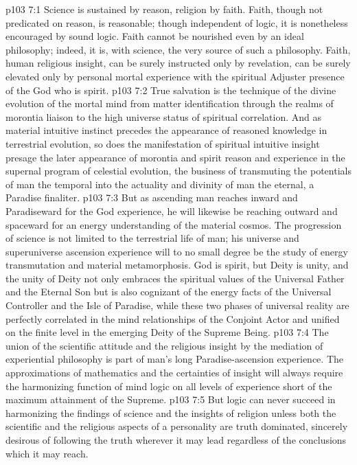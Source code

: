 \vs p103 7:1 Science is sustained by reason, religion by faith. Faith, though not predicated on reason, is reasonable; though independent of logic, it is nonetheless encouraged by sound logic. Faith cannot be nourished even by an ideal philosophy; indeed, it is, with science, the very source of such a philosophy. Faith, human religious insight, can be surely instructed only by revelation, can be surely elevated only by personal mortal experience with the spiritual Adjuster presence of the God who is spirit.
\vs p103 7:2 \pc True salvation is the technique of the divine evolution of the mortal mind from matter identification through the realms of morontia liaison to the high universe status of spiritual correlation. And as material intuitive instinct precedes the appearance of reasoned knowledge in terrestrial evolution, so does the manifestation of spiritual intuitive insight presage the later appearance of morontia and spirit reason and experience in the supernal program of celestial evolution, the business of transmuting the potentials of man the temporal into the actuality and divinity of man the eternal, a Paradise finaliter.
\vs p103 7:3 But as ascending man reaches inward and Paradiseward for the God experience, he will likewise be reaching outward and spaceward for an energy understanding of the material cosmos. The progression of science is not limited to the terrestrial life of man; his universe and superuniverse ascension experience will to no small degree be the study of energy transmutation and material metamorphosis. God is spirit, but Deity is unity, and the unity of Deity not only embraces the spiritual values of the Universal Father and the Eternal Son but is also cognizant of the energy facts of the Universal Controller and the Isle of Paradise, while these two phases of universal reality are perfectly correlated in the mind relationships of the Conjoint Actor and unified on the finite level in the emerging Deity of the Supreme Being.
\vs p103 7:4 \pc The union of the scientific attitude and the religious insight by the mediation of experiential philosophy is part of man’s long Paradise\hyp{}ascension experience. The approximations of mathematics and the certainties of insight will always require the harmonizing function of mind logic on all levels of experience short of the maximum attainment of the Supreme.
\vs p103 7:5 But logic can never succeed in harmonizing the findings of science and the insights of religion unless both the scientific and the religious aspects of a personality are truth dominated, sincerely desirous of following the truth wherever it may lead regardless of the conclusions which it may reach.
